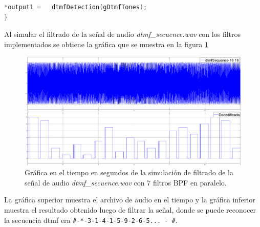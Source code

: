 \begin{enumerate}
\begin{lstlisting}[language = C]
  *output1 =   dtmfDetection(gDtmfTones);
}
    \end{lstlisting}


Al simular el filtrado de la señal de audio \textit{dtmf\_secuence.wav} con los filtros implementados se obtiene la gráfica que se muestra en la figura \ref{dtmf}

\begin{figure}[H]
    \centering
    \includegraphics[scale = 0.3]{Figuras/p6_3-Dtmf.png}
    \caption{Gráfica en el tiempo en segundos de la simulación de filtrado de la señal de audio \textit{dtmf\_secuence.wav} con 7 filtros BPF  en paralelo.}
    \label{dtmf}
\end{figure}


La gráfica superior muestra el archivo de audio en el tiempo  y la gráfica inferior muestra el resultado obtenido luego de filtrar la señal, donde se puede reconocer  la secuencia dtmf era \texttt{\#-*-3-1-4-1-5-9-2-6-5... - \#}.

\end{enumerate}